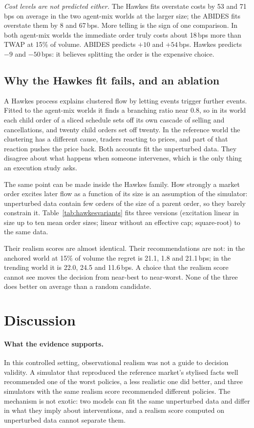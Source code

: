 \emph{Cost levels are not predicted either.} The Hawkes fits overstate costs by 53 and 71\,bps on average in the two agent-mix worlds at the larger size; the ABIDES fits overstate them by 8 and 67\,bps. More telling is the sign of one comparison. In both agent-mix worlds the immediate order truly costs about 18\,bps more than TWAP at 15\% of volume. ABIDES predicts $+10$ and $+54$\,bps. Hawkes predicts $-9$ and $-50$\,bps: it believes splitting the order is the expensive choice.

\subsection{Why the Hawkes fit fails, and an ablation}

A Hawkes process explains clustered flow by letting events trigger further events. Fitted to the agent-mix worlds it finds a branching ratio near 0.8, so in its world each child order of a sliced schedule sets off its own cascade of selling and cancellations, and twenty child orders set off twenty. In the reference world the clustering has a different cause, traders reacting to prices, and part of that reaction pushes the price back. Both accounts fit the unperturbed data. They disagree about what happens when someone intervenes, which is the only thing an execution study asks.

The same point can be made inside the Hawkes family. How strongly a market order excites later flow as a function of its size is an assumption of the simulator: unperturbed data contain few orders of the size of a parent order, so they barely constrain it. Table~\ref{tab:hawkesvariants} fits three versions (excitation linear in size up to ten mean order sizes; linear without an effective cap; square-root) to the same data.



Their realism scores are almost identical. Their recommendations are not: in the anchored world at 15\% of volume the regret is 21.1, 1.8 and 21.1\,bps; in the trending world it is 22.0, 24.5 and 11.6\,bps. A choice that the realism score cannot see moves the decision from near-best to near-worst. None of the three does better on average than a random candidate.

\section{Discussion}

\paragraph{What the evidence supports.} In this controlled setting, observational realism was not a guide to decision validity. A simulator that reproduced the reference market's stylised facts well recommended one of the worst policies, a less realistic one did better, and three simulators with the same realism score recommended different policies. The mechanism is not exotic: two models can fit the same unperturbed data and differ in what they imply about interventions, and a realism score computed on unperturbed data cannot separate them.

